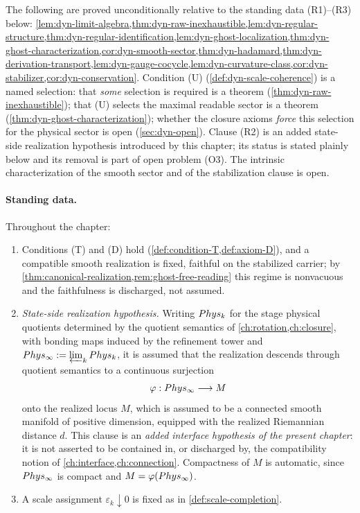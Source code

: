 \begin{remark}
	\label{rem:dyn-status}
	The following are proved unconditionally relative to the standing
	data \textup{(R1)}--\textup{(R3)} below:
	\cref{lem:dyn-limit-algebra,thm:dyn-raw-inexhaustible,lem:dyn-regular-structure,thm:dyn-regular-identification,lem:dyn-ghost-localization,thm:dyn-ghost-characterization,cor:dyn-smooth-sector,thm:dyn-hadamard,thm:dyn-derivation-transport,lem:dyn-gauge-cocycle,lem:dyn-curvature-class,cor:dyn-stabilizer,cor:dyn-conservation}.
	Condition \textup{(U)} (\cref{def:dyn-scale-coherence}) is a named
	selection: that \emph{some} selection is required is a theorem
	(\cref{thm:dyn-raw-inexhaustible}); that \textup{(U)} selects the
	maximal readable sector is a theorem
	(\cref{thm:dyn-ghost-characterization}); whether the closure
	axioms \emph{force} this selection for the physical sector is open
	(\cref{sec:dyn-open}). Clause \textup{(R2)} is an added state-side
	realization hypothesis introduced by this chapter; its status is
	stated plainly below and its removal is part of open problem
	\textup{(O3)}. The intrinsic characterization of the smooth sector
	and of the stabilization clause is open.
\end{remark}

\paragraph{Standing data.}
Throughout the chapter:
\begin{enumerate}[label=\textup{(R\arabic*)}]
	\item
	      Conditions \textup{(T)} and \textup{(D)} hold
	      (\cref{def:condition-T,def:axiom-D}), and a compatible smooth
	      realization is fixed, faithful on the stabilized carrier; by
	      \cref{thm:canonical-realization,rem:ghost-free-reading} this
	      regime is nonvacuous and the faithfulness is discharged, not
	      assumed.
	\item
	      \emph{State-side realization hypothesis.} Writing
	      \(Phys_k\) for the stage physical quotients determined by the
	      quotient semantics of \cref{ch:rotation,ch:closure}, with
	      bonding maps induced by the refinement tower and
	      \(Phys_\infty:=\varprojlim_kPhys_k\), it is assumed that the
	      realization descends through quotient semantics to a
	      continuous surjection
	      \[
		      \varphi:Phys_\infty\longrightarrow M
	      \]
	      onto the realized locus \(M\), which is assumed to be a
	      connected smooth manifold of positive dimension, equipped with
	      the realized Riemannian distance \(d\). This clause is an
	      \emph{added interface hypothesis of the present chapter}: it
	      is not asserted to be contained in, or discharged by, the
	      compatibility notion of \cref{ch:interface,ch:connection}.
	      Compactness of \(M\) is automatic, since \(Phys_\infty\) is
	      compact and \(M=\varphi(Phys_\infty)\).
	\item
	      A scale assignment \(\varepsilon_k\downarrow0\) is fixed as in
	      \cref{def:scale-completion}.
\end{enumerate}

